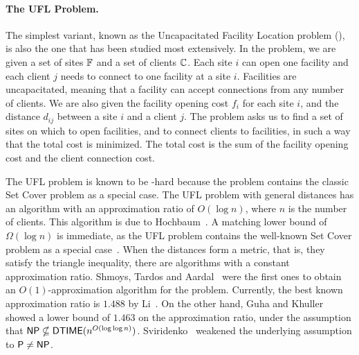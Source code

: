 \documentclass[oneside,final]{ucr}
\begin{document}
\paragraph{The UFL Problem.}
The simplest variant, known as the Uncapacitated Facility
Location problem ({\UFL}), is also the one that has been
studied most extensively. In the {\UFL} problem, we are
given a set of sites $\mathbb{F}$ and a set of clients
$\mathbb{C}$. Each site $i$ can open one facility and each
client $j$ needs to connect to one facility at a site
$i$. Facilities are uncapacitated, meaning that a facility
can accept connections from any number of clients. We are
also given the facility opening cost $f_i$ for each site
$i$, and the distance $d_{ij}$ between a site $i$ and a
client $j$. The problem asks us to find a set of sites on
which to open facilities, and to connect clients to
facilities, in such a way that the total cost is
minimized. The total cost is the sum of the facility opening
cost and the client connection cost.

The UFL problem is known to be \NP-hard because the problem
contains the classic Set Cover problem as a special
case. The UFL problem with general distances has an
algorithm with an approximation ratio of $O(\log n)$, where
$n$ is the number of clients. This algorithm is due to
Hochbaum~\cite{Hochbaum82}. A matching lower bound of
$\Omega(\log n)$ is immediate, as the UFL problem contains
the well-known Set Cover problem as a special
case~\cite{Hochbaum82}. When the distances form a metric,
that is, they satisfy the triangle inequality, there are
algorithms with a constant approximation ratio. Shmoys,
Tardos and Aardal~\cite{ShmoysTA97} were the first ones to
obtain an $O(1)$-approximation algorithm for the {\UFL}
problem. Currently, the best known approximation ratio is
$1.488$ by Li~\cite{Li11}. On the other hand, Guha and
Khuller~\cite{GuhaK98} showed a lower bound of $1.463$ on
the approximation ratio, under the assumption that ${\mbox{\sf NP}}
\nsubseteq {\mbox{\sf DTIME}}(n^{O(\log\log
  n)})$. Sviridenko~\cite{Vygen05} weakened the underlying
assumption to ${\mbox{\sf P}} \neq {\mbox{\sf NP}}$.
\end{document}
